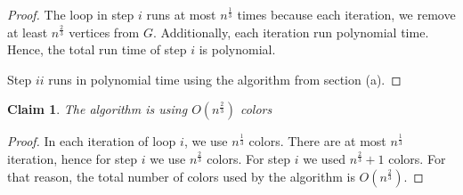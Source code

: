 \documentclass{article}
\newtheorem{claim}[section]{Claim}
\begin{document}
\begin{enumerate}
\begin{enumerate}
\begin{proof}
		The loop in step $i$ runs at most $n^\frac{1}{3}$ times because each iteration, we remove at least $n^\frac{2}{3}$ vertices from $G$. Additionally, each iteration run polynomial time. Hence, the total run time of step $i$ is polynomial.
		
		Step $ii$ runs in polynomial time using the algorithm from section (a).
	\end{proof}
	
	\begin{claim}
		The algorithm is using $O(n^\frac{2}{3})$ colors
	\end{claim}
	\begin{proof}
		In each iteration of loop $i$, we use $n^\frac{1}{3}$ colors. There are at most $n^\frac{1}{3}$ iteration, hence for step $i$ we use $n^\frac{2}{3}$ colors.
		For step $i$ we used $n^\frac{2}{3} + 1$ colors.
		For that reason, the total number of colors used by the algorithm is $O(n^\frac{2}{3})$.
	\end{proof}
\end{enumerate}

\end{enumerate}
\end{document}
